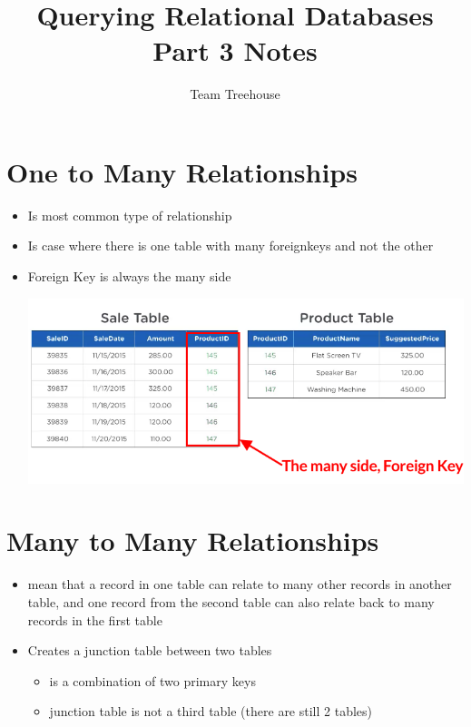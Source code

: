 \documentclass[12pt]{article}
\begin{document}
\title{Querying Relational Databases Part 3 Notes}
\author{Team Treehouse}
\maketitle

\bigskip

\section{One to Many Relationships}

\bigskip

\begin{itemize}
    \item Is most common type of relationship
    \item Is case where there is one table with many foreignkeys and not the other
    \item Foreign Key is always the many side

    \begin{center}
    \includegraphics[width=0.8\linewidth]{images/part_3_notes_1.png}
    \end{center}
\end{itemize}

\bigskip

\section{Many to Many Relationships}

\bigskip

\begin{itemize}
    \item mean that a record in one table can relate to many other records in
    another table, and one record from the second table can also relate back
    to many records in the first table
    \item Creates a junction table between two tables
    \begin{itemize}
        \item is a combination of two primary keys
        \item junction table is not a third table (there are still 2 tables)
    \end{itemize}
\end{itemize}
\end{document}
